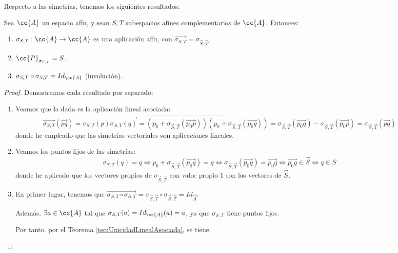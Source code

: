 Respecto a las simetrías, tenemos los siguientes resultados:
\begin{prop}
    Sea $\cc{A}$ un espacio afín, y sean $S,T$ subespacios afines complementarios de $\cc{A}$. Entonces:
    \begin{enumerate}
        \item $\sigma_{S,T}:\cc{A}\to \cc{A}$ es una aplicación afín, con $\vec{\sigma_{S,T}}=\sigma_{\vec{S}, \vec{T}}$.
        \item $\cc{P}_{\sigma_{S,T}}=S$.
        \item $\sigma_{S,T}\circ \sigma_{S,T} =Id_{\cc{A}}$ (involución).
    \end{enumerate}
\end{prop}
\begin{proof} Demostramos cada resultado por separado:
\begin{enumerate}
    \item Veamos que la dada es la aplicación lineal asociada:
    \begin{equation*}
        \vec{\sigma_{S,T}}(\vec{pq}) = \vec{\sigma_{S,T}(p)\sigma_{S,T}(q)} = \vec{(p_0+\sigma_{\vec{S}, \vec{T}}(\vec{p_0p}))(p_0+\sigma_{\vec{S}, \vec{T}}(\vec{p_0q}))} = \sigma_{\vec{S}, \vec{T}}(\vec{p_0q})-\sigma_{\vec{S}, \vec{T}}(\vec{p_0p}) = \sigma_{\vec{S}, \vec{T}}(\vec{pq})
    \end{equation*}
    donde he empleado que las simetrías vectoriales son aplicaciones lineales.

    \item Veamos los puntos fijos de las simetrías:
    \begin{equation*}
        \sigma_{S,T}(q)=q \Longleftrightarrow p_0 + \sigma_{\vec{S}, \vec{T}}(\vec{p_0q}) = q
        \Longleftrightarrow \sigma_{\vec{S}, \vec{T}}(\vec{p_0q}) = \vec{p_0q}
        \Longleftrightarrow \vec{p_0q}\in \vec{S}
        \Longleftrightarrow q\in S
    \end{equation*}
    donde he aplicado que los vectores propios de $\sigma_{\vec{S}, \vec{T}}$ con valor propio $1$ son los vectores de $\vec{S}$.

    \item En primer lugar, tenemos que $\vec{\sigma_{S,T}\circ \sigma_{S,T}} = \sigma_{\vec{S}, \vec{T}}\circ \sigma_{\vec{S}, \vec{T}} = Id_{\vec{A}}$.

    Además, $\exists a\in \cc{A}$ tal que $\sigma_{S,T}(a)=Id_{\cc{A}}(a)=a$, ya que $\sigma_{S,T}$ tiene puntos fijos.

    Por tanto, por el Teorema \ref{teo:UnicidadLinealAsociada}, se tiene.
\end{enumerate}
\end{proof}




